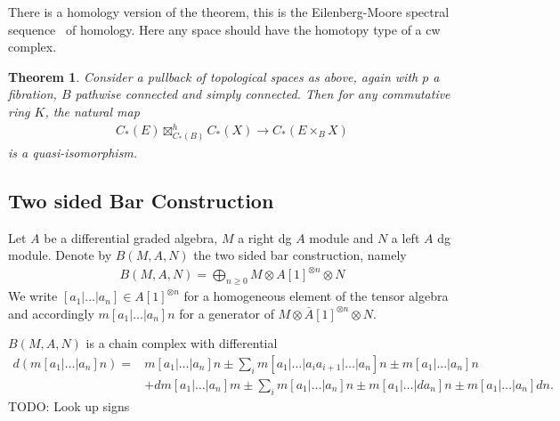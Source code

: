 \documentclass{scrartcl}
\theoremstyle{plain}
\newtheorem{theorem}{Theorem}[section]
\theoremstyle{definition}
\begin{document}
There is a homology version of the theorem, this is the Eilenberg-Moore spectral sequence~\cite{eilenberg1966homology} of homology. Here any space should have the homotopy type of a cw complex.

\begin{theorem}
    Consider a pullback of topological spaces as above, again with $p$ a fibration, $B$ pathwise connected and simply connected. Then for any commutative ring $K$, the natural map
    \begin{align*}
        C_*(E)\boxtimes_{C_*(B)}^h C_*(X) \to C_*(E\times_B X)
    \end{align*}
    is a quasi-isomorphism.
\end{theorem}


\subsection{Two sided Bar Construction}\label{subseq:bar_construction}
Let $A$ be a differential graded algebra, $M$ a right dg $A$ module and $N$ a left $A$ dg module. Denote by $B(M, A, N)$ the two sided bar construction, namely 
\begin{align*}
    B(M, A, N) = \bigoplus_{n\geq 0} M\otimes A[1]^{\otimes n} \otimes N
\end{align*}
We write $[a_1|\dots|a_n]\in A[1]^{\otimes n}$ for a homogeneous element of the tensor algebra and accordingly $m[a_1|\dots|a_n]n$ for a generator of $M\otimes \bar A[1]^{\otimes n}\otimes N$.


$B(M, A, N)$ is a chain complex with differential 
\begin{align*}d(m[a_1|\dots|a_n]n) =& m [a_1|\dots|a_n]n \pm \sum_i m[a_1|\dots|a_i a_{i+1}| \dots|a_n]n \pm m[a_1|\dots|a_n] n\\& + dm[a_1|\dots|a_n]m \pm \sum_i m[a_1|\dots|a_n]n \pm m[a_1|\dots|d a_n]n \pm m[a_1|\dots|a_n]dn.
\end{align*}
TODO: Look up signs
\end{document}
